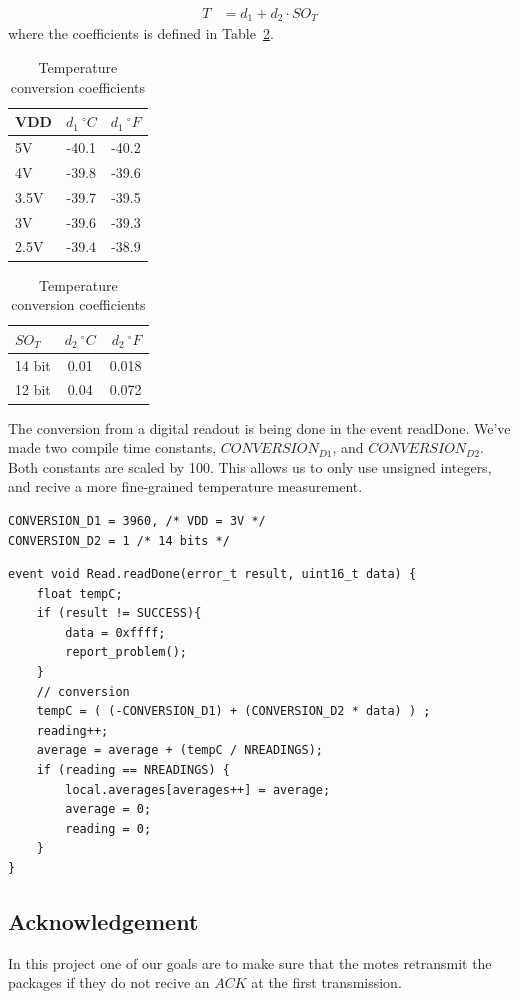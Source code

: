 \begin{align*}
	T &= d_{1} + d_{2} \cdot SO_{T}
\end{align*}
where the coefficients is defined in Table~\ref{table:temperature}.
\begin{table}[ht]
\centering
\begin{tabular}{ | l | c | r | }
	\hline
	VDD & $d_{1} \ ^{\circ}  C$ & $d_{1} \ ^{\circ}  F$ \\
	\hline \hline
	5V & -40.1 & -40.2 \\
	\hline
	4V & -39.8 & -39.6 \\
	\hline
	3.5V & -39.7 & -39.5 \\
	\hline
	3V & -39.6 & -39.3 \\
	\hline
	2.5V & -39.4 & -38.9 \\
	\hline
\end{tabular}
\begin{tabular}{ | l | c | r | }
	\hline
	$SO_{T}$ & $d_{2}  \ ^{\circ}C$ & $d_{2} \ ^{\circ} F$ \\
	\hline \hline
	14 bit & 0.01 & 0.018 \\
	\hline
	12 bit & 0.04 & 0.072\\
	\hline
\end{tabular}
\caption{Temperature conversion coefficients}
\label{table:temperature}
\end{table}
The conversion from a digital readout is being done in the event readDone.
We've made two compile time constants, $CONVERSION_{D1}$, and
$CONVERSION_{D2}$. Both constants are scaled by 100. This allows us to only use
unsigned integers, and recive a more fine-grained temperature measurement.

\begin{lstlisting}[caption={Temperature.h}]
CONVERSION_D1 = 3960, /* VDD = 3V */
CONVERSION_D2 = 1 /* 14 bits */
\end{lstlisting}

\begin{lstlisting}[caption={TemperatureC.nc}]
event void Read.readDone(error_t result, uint16_t data) {
	float tempC;
	if (result != SUCCESS){
		data = 0xffff;
		report_problem();
	}
	// conversion
	tempC = ( (-CONVERSION_D1) + (CONVERSION_D2 * data) ) ;
	reading++;
	average = average + (tempC / NREADINGS);
	if (reading == NREADINGS) {
		local.averages[averages++] = average;
		average = 0;
		reading = 0;
	}
}
\end{lstlisting}

\subsection{Acknowledgement}
In this project one of our goals are to make sure that the motes retransmit the
packages if they do not recive an $ACK$ at the first transmission.

